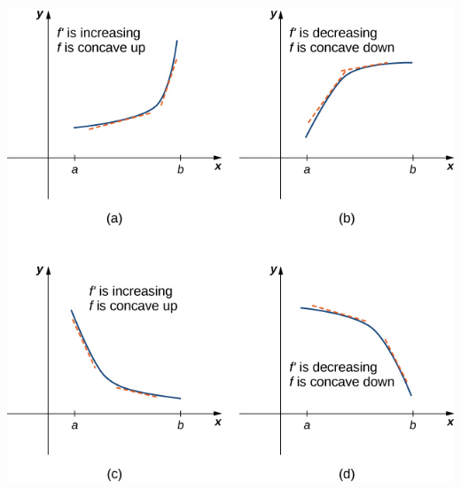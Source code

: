 \documentclass[12pt]{amsart}
\begin{document}
\begin{center}
	\includegraphics{fig3.jpeg}
\end{center}
\end{document}
